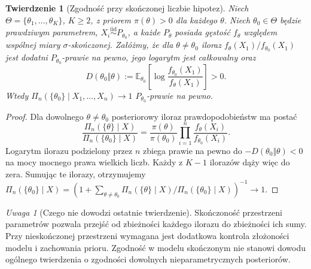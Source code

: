 \documentclass[11pt,a4paper,oneside]{report}
\numberwithin{equation}{chapter}
\theoremstyle{plain}
\newtheorem{twierdzenie}{Twierdzenie}[chapter]
\theoremstyle{definition}
\theoremstyle{remark}
\newtheorem{uwaga}{Uwaga}[chapter]
\newcommand{\E}{\mathbb E}
\newcommand{\iid}{\mathrel{\overset{\mathrm{iid}}\sim}}
\begin{document}
\begin{twierdzenie}[Zgodność przy skończonej liczbie hipotez]
\label{thm:finite-bayes-consistency}
Niech $\Theta=\{\theta_1,\ldots,\theta_K\}$,
$K\ge2$, z priorem $\pi(\theta)>0$ dla każdego $\theta$.
Niech $\theta_0\in\Theta$ będzie prawdziwym parametrem,
$X_i\iid P_{\theta_0}$, a każde $P_\theta$ posiada
gęstość $f_\theta$ względem wspólnej miary $\sigma$-skończonej.
Załóżmy, że dla $\theta\ne\theta_0$ iloraz
$f_\theta(X_1)/f_{\theta_0}(X_1)$ jest dodatni
$P_{\theta_0}$-prawie na pewno, jego logarytm jest
całkowalny oraz
\[
 D(\theta_0\Vert\theta)
 :=\E_{\theta_0}\!\left[
  \log\frac{f_{\theta_0}(X_1)}{f_\theta(X_1)}\right]>0.
\]
Wtedy $\Pi_n(\{\theta_0\}\mid X_1,\ldots,X_n)\to1$
$P_{\theta_0}$-prawie na pewno.
\end{twierdzenie}
\begin{proof}
Dla dowolnego $\theta\ne\theta_0$ posteriorowy iloraz
prawdopodobieństw ma postać
\[
 \frac{\Pi_n(\{\theta\}\mid X)}{\Pi_n(\{\theta_0\}\mid X)}
 =\frac{\pi(\theta)}{\pi(\theta_0)}
 \prod_{i=1}^n\frac{f_\theta(X_i)}{f_{\theta_0}(X_i)}.
\]
Logarytm ilorazu podzielony przez $n$ zbiega
prawie na pewno do $-D(\theta_0\Vert\theta)<0$
na mocy mocnego prawa wielkich liczb. Każdy z $K-1$
ilorazów dąży więc do zera. Sumując te ilorazy,
otrzymujemy
$\Pi_n(\{\theta_0\}\mid X)
 =(1+\sum_{\theta\ne\theta_0}\Pi_n(\{\theta\}\mid X)/
 \Pi_n(\{\theta_0\}\mid X))^{-1}\to1$.
\end{proof}

\begin{uwaga}[Czego nie dowodzi ostatnie twierdzenie]
Skończoność przestrzeni parametrów pozwala przejść od
zbieżności każdego ilorazu do zbieżności ich sumy.
Przy nieskończonej przestrzeni wymagana jest dodatkowa
kontrola złożoności modelu i zachowania prioru. Zgodność
w modelu skończonym nie stanowi dowodu ogólnego twierdzenia
o zgodności dowolnych nieparametrycznych posteriorów.
\end{uwaga}
\end{document}
